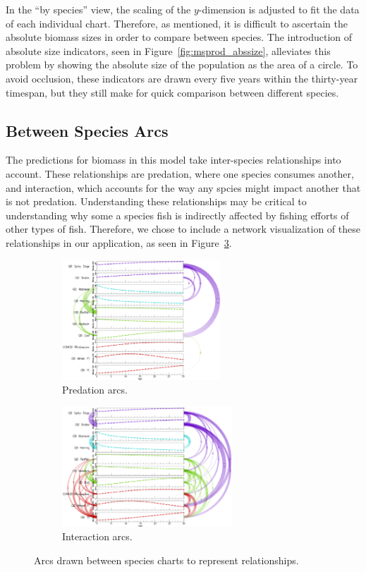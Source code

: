 In the ``by species'' view, the scaling of the $y$-dimension is adjusted to fit the data of each individual chart.  Therefore, as mentioned, it is difficult to ascertain the absolute biomass sizes in order to compare between species.  The introduction of absolute size indicators, seen in Figure~\ref{fig:msprod_abssize}, alleviates this problem by showing the absolute size of the population as the area of a circle.  To avoid occlusion, these indicators are drawn every five years within the thirty-year timespan, but they still make for quick comparison between different species.

\subsection{Between Species Arcs}

The predictions for biomass in this model take inter-species relationships into account.  These relationships are predation, where one species consumes another, and interaction, which accounts for the way any spcies might impact another that is not predation.  Understanding these relationships may be critical to understanding why some a species fish is indirectly affected by fishing efforts of other types of fish.  Therefore, we chose to include a network visualization of these relationships in our application, as seen in Figure~\ref{fig:betweenSpeciesArcs}.

\begin{figure}
\centering
	\begin{subfigure}[b]{0.48\textwidth}
		\centering
		\includegraphics[height=4.5cm]{figures/eps/arcs_predation.eps}
		\caption{Predation arcs.}
		\label{fig:arcsPredation}
	\end{subfigure}	
	\begin{subfigure}[b]{0.48\textwidth}
		\centering
		\includegraphics[height=4.5cm]{figures/eps/arcs_interaction.eps}
		\caption{Interaction arcs.}
		\label{fig:arcsInteraction}
	\end{subfigure}
	\caption{Arcs drawn between species charts to represent relationships.}
	\label{fig:betweenSpeciesArcs}
\end{figure}

